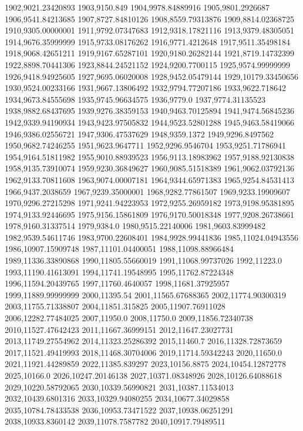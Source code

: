 1902,9021.23420893
1903,9150.849
1904,9978.84889916
1905,9801.2926687
1906,9541.84213685
1907,8727.84810126
1908,8559.79313876
1909,8814.02368725
1910,9305.00000001
1911,9792.07347683
1912,9318.17821116
1913,9379.48305051
1914,9676.35999999
1915,9733.08176262
1916,9771.4212648
1917,9511.35498184
1918,9068.42651211
1919,9167.65287101
1920,9180.26282144
1921,8719.14732399
1922,8898.70441306
1923,8844.24521152
1924,9200.7700115
1925,9574.99999999
1926,9418.94925605
1927,9695.06020008
1928,9452.05479144
1929,10179.33450656
1930,9524.00233166
1931,9667.13806492
1932,9794.77207186
1933,9622.718642
1934,9673.84555698
1935,9745.96634575
1936,9779.0
1937,9774.31135523
1938,9882.68437695
1939,9276.38359153
1940,9463.70125894
1941,9474.56845236
1942,9339.94190934
1943,9423.97505832
1944,9523.52801288
1945,9463.58419066
1946,9386.02556721
1947,9306.47537629
1948,9359.1372
1949,9296.8497562
1950,9682.74246255
1951,9623.9647711
1952,9296.9546704
1953,9251.71786941
1954,9164.51811982
1955,9010.88939523
1956,9113.18983962
1957,9188.92130838
1958,9135.73910074
1959,9230.36849627
1960,9085.51518389
1961,9062.03792136
1962,9133.70811608
1963,9074.00007181
1964,9344.65971383
1965,9254.84531413
1966,9437.2038659
1967,9239.35000001
1968,9282.77861507
1969,9233.19909607
1970,9296.27215298
1971,9241.94223953
1972,9255.26959182
1973,9198.95381895
1974,9133.92446695
1975,9156.15861809
1976,9170.50018348
1977,9208.26738661
1978,9160.31337514
1979,9384.0
1980,9515.22140006
1981,9603.83999482
1982,9539.54611746
1983,9700.22608401
1984,9928.99441836
1985,11024.04943556
1986,10907.15909748
1987,11101.04400051
1988,11098.88966484
1989,11336.33890868
1990,11805.55660019
1991,11068.99737026
1992,11223.0
1993,11190.41613091
1994,11741.19548995
1995,11762.87224348
1996,11594.20439765
1997,11760.4640057
1998,11681.37925957
1999,11889.99999999
2000,11395.54
2001,11565.67688365
2002,11774.90300319
2003,11755.71338807
2004,11851.315825
2005,11907.76911028
2006,12282.77484025
2007,11950.0
2008,11750.0
2009,11856.72340738
2010,11527.47642423
2011,11667.36999151
2012,11647.23027731
2013,11749.27554962
2014,11323.25286392
2015,11460.7
2016,11328.72873659
2017,11521.49419993
2018,11468.30704006
2019,11714.59342243
2020,11650.0
2021,11921.44289859
2022,11385.839297
2023,10156.8875
2024,10454.12872778
2025,10166.0
2026,10247.20146138
2027,10371.08348926
2028,10126.64088618
2029,10220.58792065
2030,10339.56990821
2031,10387.11534013
2032,10439.6801316
2033,10329.94080255
2034,10677.34029858
2035,10784.78433538
2036,10953.73471522
2037,10938.06251291
2038,10933.8360142
2039,11078.7587782
2040,10917.79489511
